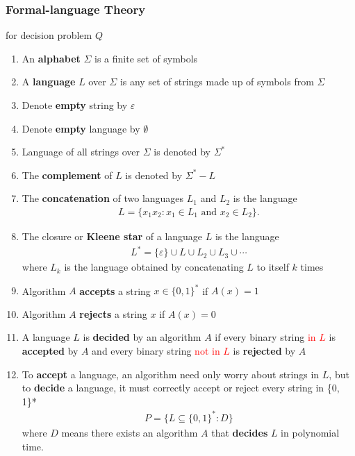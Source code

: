 \documentclass{article}
\begin{document}
\subsubsection{Formal-language Theory}
for decision problem $Q$
\begin{enumerate}\small
    \item An \textbf{alphabet} $\Sigma$ is a finite set of symbols
    \item A \textbf{language} $L$ over $\Sigma$ is any set of strings made up of symbols from $\Sigma$
    \item Denote \textbf{empty} string by $\varepsilon$ 
    \item Denote \textbf{empty} language by $\emptyset$ 
    \item Language of all strings over $\Sigma$ is denoted by $\Sigma^*$
    \item The \textbf{complement} of $L$ is denoted by $\Sigma^*-L$  
    \item The \textbf{concatenation} of two languages $L_1$ and $L_2$ is the language 
    \begin{align*}
        L = \{ x_1 x_2 : x_1 \in L_1 \text{ and } x_2 \in L_2 \}.
    \end{align*}
    \item The closure or \textbf{Kleene star} of a language $L$ is the language
    \begin{align*}
        L^*= \{\varepsilon\} \cup L \cup L_2 \cup L_3 \cup \cdots
    \end{align*}
    where $L_k$ is the language obtained by concatenating $L$ to itself $k$ times
    \item Algorithm $A$ \textbf{accepts} a string $x \in \{0, 1\}^*$ if $A(x) = 1$
    \item Algorithm $A$ \textbf{rejects} a string $x$ if $A(x) = 0$
    \item A language $L$ is \textbf{decided} by an algorithm $A$ if every binary string \textcolor{red}{in $L$} is \textbf{accepted} by $A$ and every binary string \textcolor{red}{not in $L$} is \textbf{rejected} by $A$
    \item To \textbf{accept} a language, an algorithm need only worry about strings in $L$, but to \textbf{decide} a language, it must correctly accept or reject every string in \{0, 1\}*
    \begin{align*}
        P = \{ L \subseteq \{0, 1\}^* : D \}
    \end{align*}
    where $D$ means there exists an algorithm $A$ that \textbf{decides} $L$ in polynomial time. 

\end{enumerate}
\end{document}
